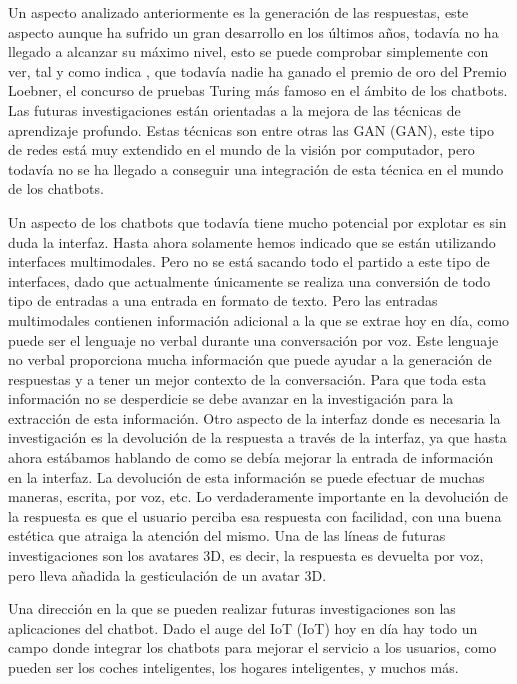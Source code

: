 Un aspecto analizado anteriormente es la generación de las respuestas, este aspecto aunque ha sufrido un gran desarrollo en los últimos años, todavía no ha llegado a alcanzar su máximo nivel, esto se puede comprobar simplemente con ver, tal y como indica \cite{RefWorks:RefID:36-luo2022critical}, que todavía nadie ha ganado el premio de oro del Premio Loebner, el concurso de pruebas Turing más famoso en el ámbito de los chatbots. Las futuras investigaciones están orientadas a la mejora de las técnicas de aprendizaje profundo. Estas técnicas son entre otras las \gls{GAN} (GAN), este tipo de redes está muy extendido en el mundo de la visión por computador, pero todavía no se ha llegado a conseguir una integración de esta técnica en el mundo de los chatbots.

Un aspecto de los chatbots que todavía tiene mucho potencial por explotar es sin duda la interfaz. Hasta ahora solamente hemos indicado que se están utilizando interfaces multimodales. Pero no se está sacando todo el partido a este tipo de interfaces, dado que actualmente únicamente se realiza una conversión de todo tipo de entradas a una entrada en formato de texto. Pero las entradas multimodales contienen información adicional a la que se extrae hoy en día, como puede ser el lenguaje no verbal durante una conversación por voz. Este lenguaje no verbal proporciona mucha información que puede ayudar a la generación de respuestas y a tener un mejor contexto de la conversación. Para que toda esta información no se desperdicie se debe avanzar en la investigación para la extracción de esta información. Otro aspecto de la interfaz donde es necesaria la investigación es la devolución de la respuesta a través de la interfaz, ya que hasta ahora estábamos hablando de como se debía mejorar la entrada de información en la interfaz. La devolución de esta información se puede efectuar de muchas maneras, escrita, por voz, etc. Lo verdaderamente importante en la devolución de la respuesta es que el usuario perciba esa respuesta con facilidad, con una buena estética que atraiga la atención del mismo. Una de las líneas de futuras investigaciones son los avatares 3D, es decir, la respuesta es devuelta por voz, pero lleva añadida la gesticulación de un avatar 3D.

Una dirección en la que se pueden realizar futuras investigaciones son las aplicaciones del chatbot. Dado el auge del \gls{IoT} (IoT) hoy en día hay todo un campo donde integrar los chatbots para mejorar el servicio a los usuarios, como pueden ser los coches inteligentes, los hogares inteligentes, y muchos más.

